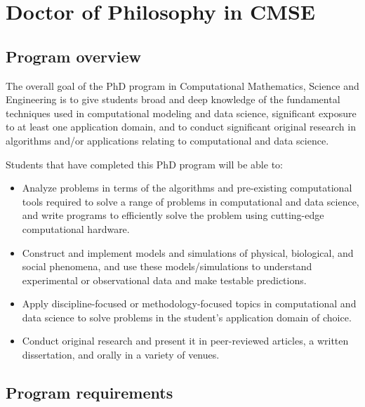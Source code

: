 \section{Doctor of Philosophy in CMSE}
\label{sec:phd}

\subsection{Program overview}
\label{sec:phd_overview}

The overall goal of the PhD program in Computational Mathematics,
Science and Engineering is to give students broad and deep knowledge
of the fundamental techniques used in computational modeling and data
science, significant exposure to at least one application domain, and
to conduct significant original research in algorithms and/or
applications relating to computational and data science.

\vspace{2mm}
\noindent
Students that have completed this PhD program will be able to:

\begin{itemize}
\item  Analyze problems in terms of the algorithms and pre-existing
  computational tools required to solve a range of problems in
  computational and data science, and write programs to efficiently
  solve the problem using cutting-edge computational hardware.  

\item  Construct and implement models and simulations of physical,
  biological, and social phenomena, and use these models/simulations
  to understand experimental or observational data and make testable predictions.  

\item  Apply discipline-focused or methodology-focused topics in
  computational and data science to solve problems in the student's
  application domain of choice.

\item  Conduct  original research and present it in
  peer-reviewed articles, a written dissertation, and orally in a
  variety of venues.  


\end{itemize}


\subsection{Program requirements}
\label{sec:phd_requirements}


